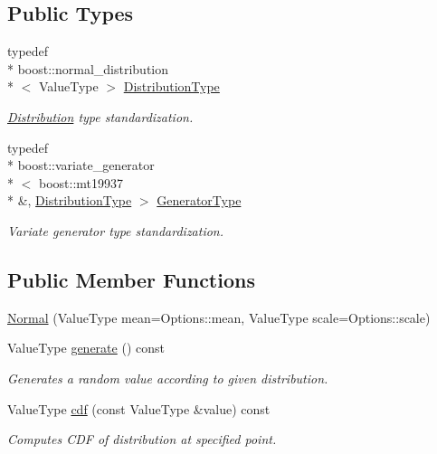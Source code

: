 \subsection*{Public Types}
\begin{DoxyCompactItemize}
\item 
typedef \\*
boost\-::normal\-\_\-distribution\\*
$<$ Value\-Type $>$ \hyperlink{classffnn_1_1distribution_1_1_normal_adde295df2a62b40cbfb9ea9728a72994}{Distribution\-Type}
\begin{DoxyCompactList}\small\item\em \hyperlink{classffnn_1_1distribution_1_1_distribution}{Distribution} type standardization. \end{DoxyCompactList}\item 
typedef \\*
boost\-::variate\-\_\-generator\\*
$<$ boost\-::mt19937 \\*
\&, \hyperlink{classffnn_1_1distribution_1_1_normal_adde295df2a62b40cbfb9ea9728a72994}{Distribution\-Type} $>$ \hyperlink{classffnn_1_1distribution_1_1_normal_a6d8c98f74c7c9fa77fa9caab1061e9b1}{Generator\-Type}
\begin{DoxyCompactList}\small\item\em Variate generator type standardization. \end{DoxyCompactList}\end{DoxyCompactItemize}
\subsection*{Public Member Functions}
\begin{DoxyCompactItemize}
\item 
\hyperlink{classffnn_1_1distribution_1_1_normal_a23bc8842e5f532cab3fe40a324a2f600}{Normal} (Value\-Type mean=Options\-::mean, Value\-Type scale=Options\-::scale)
\item 
Value\-Type \hyperlink{classffnn_1_1distribution_1_1_normal_ad90aceffa91e82ea29e4928f1aeb1bbe}{generate} () const 
\begin{DoxyCompactList}\small\item\em Generates a random value according to given distribution. \end{DoxyCompactList}\item 
Value\-Type \hyperlink{classffnn_1_1distribution_1_1_normal_a416036c5e764a324d354eea47db90115}{cdf} (const Value\-Type \&value) const 
\begin{DoxyCompactList}\small\item\em Computes C\-D\-F of distribution at specified point. \end{DoxyCompactList}\end{DoxyCompactItemize}


